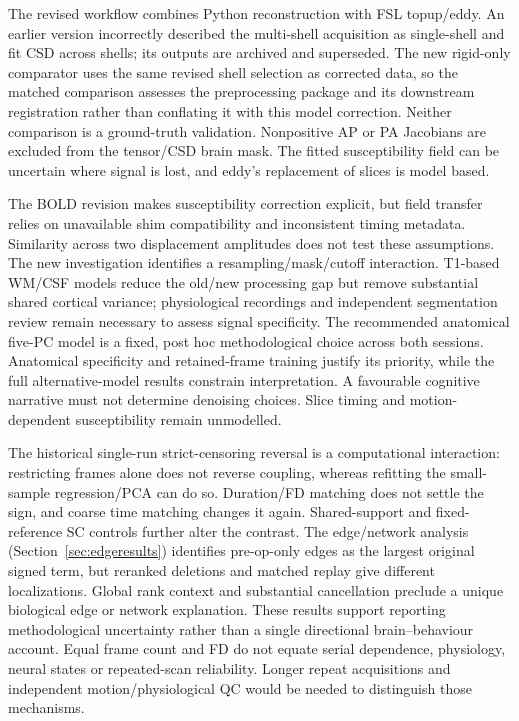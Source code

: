 \documentclass[11pt,a4paper]{article}
\begin{document}
The revised workflow combines Python reconstruction with FSL topup/eddy. An earlier version incorrectly described the multi-shell acquisition as single-shell and fit CSD across shells; its outputs are archived and superseded. The new rigid-only comparator uses the same revised shell selection as corrected data, so the matched comparison assesses the preprocessing package and its downstream registration rather than conflating it with this model correction. Neither comparison is a ground-truth validation. Nonpositive AP or PA Jacobians are excluded from the tensor/CSD brain mask. The fitted susceptibility field can be uncertain where signal is lost, and eddy's replacement of slices is model based.

The BOLD revision makes susceptibility correction explicit, but field transfer relies on unavailable shim compatibility and inconsistent timing metadata. Similarity across two displacement amplitudes does not test these assumptions. The new investigation identifies a resampling/mask/cutoff interaction. T1-based WM/CSF models reduce the old/new processing gap but remove substantial shared cortical variance; physiological recordings and independent segmentation review remain necessary to assess signal specificity. The recommended anatomical five-PC model is a fixed, post hoc methodological choice across both sessions. Anatomical specificity and retained-frame training justify its priority, while the full alternative-model results constrain interpretation. A favourable cognitive narrative must not determine denoising choices. Slice timing and motion-dependent susceptibility remain unmodelled.

The historical single-run strict-censoring reversal is a computational interaction: restricting frames alone does not reverse coupling, whereas refitting the small-sample regression/PCA can do so. Duration/FD matching does not settle the sign, and coarse time matching changes it again. Shared-support and fixed-reference SC controls further alter the contrast. The edge/network analysis (Section~\ref{sec:edgeresults}) identifies pre-op-only edges as the largest original signed term, but reranked deletions and matched replay give different localizations. Global rank context and substantial cancellation preclude a unique biological edge or network explanation. These results support reporting methodological uncertainty rather than a single directional brain--behaviour account. Equal frame count and FD do not equate serial dependence, physiology, neural states or repeated-scan reliability. Longer repeat acquisitions and independent motion/physiological QC would be needed to distinguish those mechanisms.\par
\end{document}
